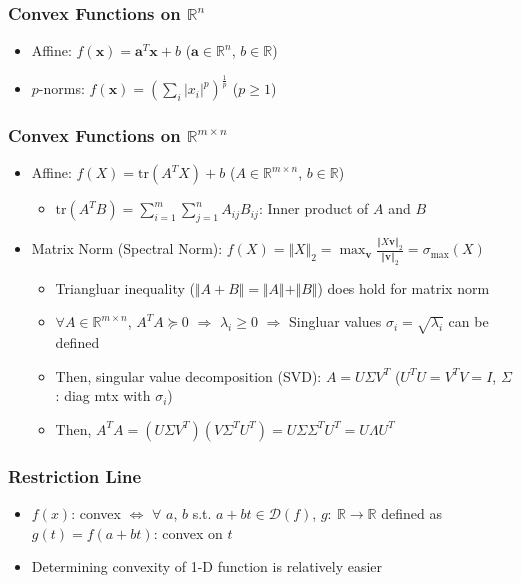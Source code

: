 \subsubsection*{Convex Functions on $\mathbb{R}^n$}
\begin{itemize}
    \item Affine: $f(\mathbf{x}) = \mathbf{a}^T\mathbf{x} + b$ ($\mathbf{a} \in \mathbb{R}^n$, $b\in\mathbb{R}$)
    \item $p$-norms: $f(\mathbf{x}) = \left(\sum_i |x_i|^p\right)^{\frac 1 p}$ ($p \geq 1$)
\end{itemize}

\subsubsection*{Convex Functions on $\mathbb{R}^{m\times n}$}
\begin{itemize}
    \item Affine: $f(X) = \mathrm{tr}(A^T X) + b$ ($A \in \mathbb{R}^{m \times n}$, $b \in \mathbb{R}$)
    \begin{itemize}
        \item $\mathrm{tr}(A^T B) = \sum_{i=1}^m \sum_{j=1}^n A_{ij} B_{ij}$: Inner product of $A$ and $B$
    \end{itemize}
    \item Matrix Norm (Spectral Norm): $f(X) = \Vert X \Vert_2 = \max_{\mathbf{v}} \frac {\Vert X\mathbf{v} \Vert_2} {\Vert \mathbf{v} \Vert_2} = \sigma_{\max}(X)$
    \begin{itemize}
        \item Triangluar inequality ($\Vert A+B \Vert = \Vert A \Vert + \Vert B \Vert$) does hold for matrix norm
        \item $\forall A \in \mathbb{R}^{m\times n}$, $A^T A \succeq 0$ $\Rightarrow$ $\lambda_i \geq 0$
            $\Rightarrow$ Singluar values $\sigma_i = \sqrt{\lambda_i}$ can be defined
        \item Then, singular value decomposition (SVD): $A = U\Sigma V^T$ ($U^TU = V^TV = I$, $\Sigma$: diag mtx with $\sigma_i$)
        \item Then, $A^T A = \left( U\Sigma V^T \right) \left(V \Sigma^T U^T \right) = U\Sigma \Sigma^T U^T = U \Lambda U^T$
    \end{itemize}
\end{itemize}

\subsubsection*{Restriction Line}
\begin{itemize}
    \item $f(x)$: convex $\Leftrightarrow$ $\forall$ $a$, $b$ s.t. $a + bt \in \mathcal{D}(f)$,
        $g:~\mathbb{R} \rightarrow \mathbb{R}$ defined as $g(t) = f(a + bt)$: convex on $t$
    \item Determining convexity of 1-D function is relatively easier
\end{itemize}


